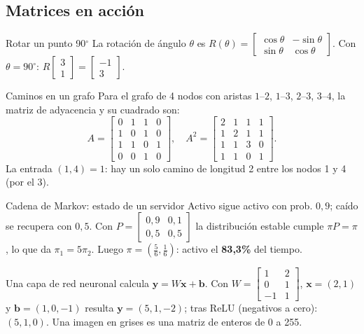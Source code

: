 \subsection{Matrices en acci\'on}
\begin{tmejemplo}{Rotar un punto 90$^\circ$}
La rotaci\'on de \'angulo $\theta$ es $R(\theta)=\begin{bmatrix}\cos\theta&-\sin\theta\\\sin\theta&\cos\theta\end{bmatrix}$. Con $\theta=90^\circ$: $R\begin{bmatrix}3\\1\end{bmatrix}=\begin{bmatrix}-1\\3\end{bmatrix}$.
\end{tmejemplo}

\begin{tmejemplo}{Caminos en un grafo}
Para el grafo de 4 nodos con aristas $1\text{--}2$, $1\text{--}3$, $2\text{--}3$, $3\text{--}4$, la matriz de adyacencia y su cuadrado son:
\[A=\begin{bmatrix}0&1&1&0\\1&0&1&0\\1&1&0&1\\0&0&1&0\end{bmatrix},\quad A^2=\begin{bmatrix}2&1&1&1\\1&2&1&1\\1&1&3&0\\1&1&0&1\end{bmatrix}.\]
La entrada $(1, 4)=1$: hay un solo camino de longitud 2 entre los nodos 1 y 4 (por el 3).
\end{tmejemplo}

\begin{tmejemplo}{Cadena de Markov: estado de un servidor}
Activo sigue activo con prob. $0{,}9$; ca\'ido se recupera con $0{,}5$. Con $P=\begin{bmatrix}0{,}9&0{,}1\\0{,}5&0{,}5\end{bmatrix}$ la distribuci\'on estable cumple $\pi P=\pi$, lo que da $\pi_1=5\pi_2$. Luego $\pi=(\frac56,\frac16)$: activo el \textbf{83,3\%} del tiempo.
\end{tmejemplo}

\begin{tmsistemas}
Una capa de red neuronal calcula $\mathbf{y}=W\mathbf{x}+\mathbf{b}$. Con $W=\begin{bmatrix}1&2\\0&1\\-1&1\end{bmatrix}$, $\mathbf{x}=(2, 1)$ y $\mathbf{b}=(1, 0,-1)$ resulta $\mathbf{y}=(5, 1,-2)$; tras ReLU (negativos a cero): $(5, 1, 0)$. Una imagen en grises es una matriz de enteros de 0 a 255.
\end{tmsistemas}

